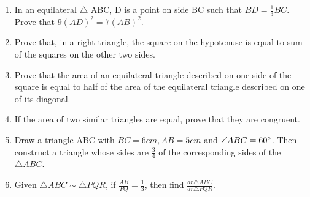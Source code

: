 \begin{enumerate}
	\item In an equilateral $\triangle$ ABC, D is a point on side BC such that $ BD =\frac{1}{3}BC$. Prove that $9(AD)^2 = 7(AB)^2$.
	\item Prove that, in a right triangle, the  square on the hypotenuse is equal to sum of the squares on the other two sides.
	\item Prove that the area of an equilateral triangle described on one side of the square is equal to half of the area of the equilateral triangle described on one of its diagonal.
	\item If the area of two similar triangles are equal, prove that they are congruent.
	\item Draw a triangle ABC with $BC=6 cm, AB=5 cm$ and $\angle{ABC}=60\degree$. Then construct a triangle whose sides are $\frac{3}{4}$ of the corresponding sides of the $\triangle ABC$.

	\item Given $\triangle ABC \sim  \triangle PQR$, if $\frac{AB}{PQ} = \frac{1}{3}$, then find $\frac{ar \triangle ABC}{ar \triangle PQR}$.
\end{enumerate}
